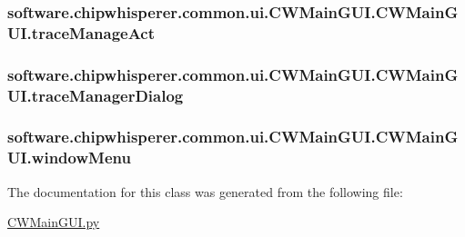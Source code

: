 \subsubsection[{trace\+Manage\+Act}]{\setlength{\rightskip}{0pt plus 5cm}software.\+chipwhisperer.\+common.\+ui.\+C\+W\+Main\+G\+U\+I.\+C\+W\+Main\+G\+U\+I.\+trace\+Manage\+Act}\label{classsoftware_1_1chipwhisperer_1_1common_1_1ui_1_1CWMainGUI_1_1CWMainGUI_ac0629882cc76ee89b8bacf1496066c8b}
\hypertarget{classsoftware_1_1chipwhisperer_1_1common_1_1ui_1_1CWMainGUI_1_1CWMainGUI_af0baf374329a3ad2e369d6f3c4e86677}{}
\subsubsection[{trace\+Manager\+Dialog}]{\setlength{\rightskip}{0pt plus 5cm}software.\+chipwhisperer.\+common.\+ui.\+C\+W\+Main\+G\+U\+I.\+C\+W\+Main\+G\+U\+I.\+trace\+Manager\+Dialog}\label{classsoftware_1_1chipwhisperer_1_1common_1_1ui_1_1CWMainGUI_1_1CWMainGUI_af0baf374329a3ad2e369d6f3c4e86677}
\hypertarget{classsoftware_1_1chipwhisperer_1_1common_1_1ui_1_1CWMainGUI_1_1CWMainGUI_af126b8e3d953ccad2f703fe696711b47}{}
\subsubsection[{window\+Menu}]{\setlength{\rightskip}{0pt plus 5cm}software.\+chipwhisperer.\+common.\+ui.\+C\+W\+Main\+G\+U\+I.\+C\+W\+Main\+G\+U\+I.\+window\+Menu}\label{classsoftware_1_1chipwhisperer_1_1common_1_1ui_1_1CWMainGUI_1_1CWMainGUI_af126b8e3d953ccad2f703fe696711b47}


The documentation for this class was generated from the following file\+:\begin{DoxyCompactItemize}
\item 
\hyperlink{CWMainGUI_8py}{C\+W\+Main\+G\+U\+I.\+py}\end{DoxyCompactItemize}
